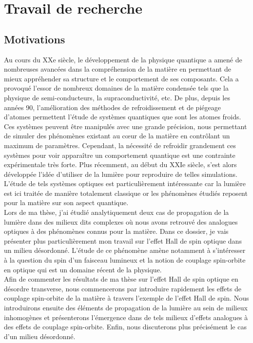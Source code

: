 \documentclass[a4paper,11pt]{article} %
\begin{document}
	
	\section{Travail de recherche}
	\subsection{Motivations}
	Au cours du XXe siècle, le développement de la physique quantique a amené de nombreuses avancées dans la compréhension de la matière en permettant de mieux appréhender sa structure et le comportement de ses composants. Cela a provoqué l'essor de nombreux domaines de la matière condensée tels que la physique de semi-conducteurs, la supraconductivité, etc. De plus, depuis les années 90, l'amélioration des méthodes de refroidissement et de piégeage d'atomes permettent l'étude de systèmes quantiques que sont les atomes froids. Ces systèmes peuvent être manipulés avec une grande précision, nous permettant de simuler des phénomènes existant au c\oe ur de la matière en contrôlant un maximum de paramètres. Cependant, la nécessité de refroidir grandement ces systèmes pour voir apparaître un comportement quantique est une contrainte expérimentale très forte. Plus récemment, au début du XXIe siècle, s'est alors développée l'idée d'utiliser de la lumière pour reproduire de telles simulations. L'étude de tels systèmes optiques est particulièrement intéressante car la lumière est ici traitée de manière totalement classique or les phénomènes étudiés reposent pour la matière sur son aspect quantique.\\
	
	Lors de ma thèse, j'ai étudié analytiquement deux cas de propagation de la lumière dans des milieux dits complexes où nous avons retrouvé des analogues optiques à des phénomènes connus pour la matière. Dans ce dossier, je vais présenter plus particulièrement mon travail sur l'effet Hall de spin optique dans un milieu désordonné. L'étude de ce phénomène amène notamment à s'intéresser à la question du spin d'un faisceau lumineux et la notion de couplage spin-orbite en optique qui est un domaine récent de la physique.\\
	
	Afin de commenter les résultats de ma thèse sur l'effet Hall de spin optique en désordre transverse, nous commencerons par introduire rapidement les effets de couplage spin-orbite de la matière à travers l'exemple de l'effet Hall de spin. Nous introduirons ensuite des éléments de propagation de la lumière au sein de milieux inhomogènes et présenterons l'émergence dans de tels milieux d'effets analogues à des effets de couplage spin-orbite. Enfin, nous discuterons plus précisément le cas d'un milieu désordonné. \\
	
\end{document}
